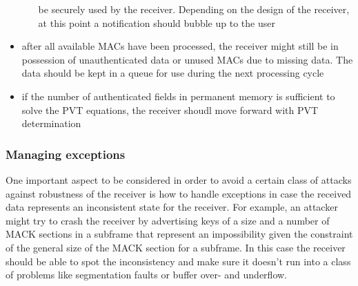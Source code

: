 \begin{itemize}
\begin{itemize}
        be securely used by the receiver. Depending on the design of the
        receiver, at this point a notification should bubble up to the user
    \end{itemize}
  \item after all available MACs have been processed, the receiver might still
    be in possession of unauthenticated data or unused MACs due to missing data.
    The data should be kept in a queue for use during the next processing cycle
  \item if the number of authenticated fields in permanent memory is sufficient
    to solve the PVT equations, the receiver shoudl move forward with PVT
    determination
\end{itemize}

\subsubsection{Managing exceptions}
One important aspect to be considered in order to avoid a certain class of
attacks against robustness of the receiver is how to handle exceptions in case
the received data represents an inconsistent state for the receiver. For
example, an attacker might try to crash the receiver by advertising keys of a
size and a number of MACK sections in a subframe that represent an impossibility
given the constraint of the general size of the MACK section for a subframe. In
this case the receiver should be able to spot the inconsistency and make sure it
doesn't run into a class of problems like segmentation faults or buffer over-
and underflow.

